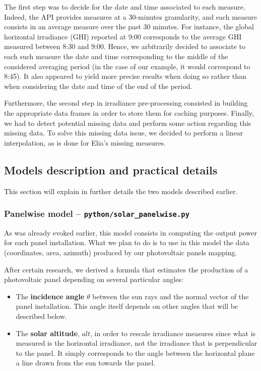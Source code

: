 \documentclass[a4paper, 12pt]{article}
\begin{document}
The first step was to decide for the date and time associated to each measure. Indeed, the API provides measures at a 30-minutes granularity, and each measure consists in an average measure over the past 30 minutes. For instance, the global horizontal irradiance (GHI) reported at 9:00 corresponds to the average GHI measured between 8:30 and 9:00. Hence, we arbitrarily decided to associate to each such measure the date and time corresponding to the middle of the considered averaging period (in the case of our example, it would correspond to 8:45). It also appeared to yield more precise results when doing so rather than when considering the date and time of the end of the period. 

Furthermore, the second step in irradiance pre-processing consisted in building the appropriate data frames in order to store them for caching purposes. Finally, we had to detect potential missing data and perform some action regarding this missing data. To solve this missing data issue, we decided to perform a linear interpolation, as is done for Elia's missing measures.

\subsection{Models description and practical details}
This section will explain in further details the two models described earlier.

\subsubsection{Panelwise model -- \texttt{python/solar\_panelwise.py}} \label{sec:panelwise}
As was already evoked earlier, this model consists in computing the output power for each panel installation. What we plan to do is to use in this model the data (coordinates, area, azimuth) produced by our photovoltaic panels mapping.

After certain research, we derived a formula that estimates the production of a photovoltaic panel depending on several particular angles:
\begin{itemize}
    \item The \textbf{incidence angle} $\theta$ between the sun rays and the normal vector of the panel installation. This angle itself depends on other angles that will be described below.
    \item The \textbf{solar altitude}, $alt$, in order to rescale irradiance measures since what is measured is the horizontal irradiance, not the irradiance that is perpendicular to the panel. It simply corresponds to the angle between the horizontal plane a line drawn from the sun towards the panel.
\end{itemize}
\end{document}
